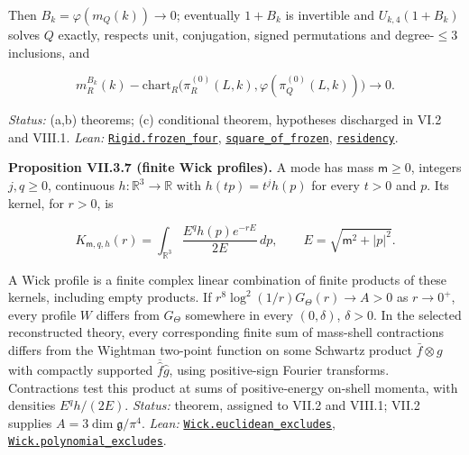 \documentclass[
  letterpaper,
  11pt]{article}
\begin{document}
Then \(B_k=\varphi(m_Q(k))\to0\); eventually \(1+B_k\) is invertible and
\(U_{k,4}(1+B_k)\) solves \(Q\) exactly, respects unit, conjugation,
signed permutations and degree-\(\le3\) inclusions, and

\[m_R^{B_k}(k)-\mathrm{chart}_R\bigl(\pi_R^{(0)}(L,k),\varphi(\pi_Q^{(0)}(L,k))\bigr)\to0.\]

\emph{Status:} (a,b) theorems; (c) conditional theorem, hypotheses
discharged in VI.2 and VIII.1. \emph{Lean:}
\href{https://github.com/yang-mills-group/OpenAI-YM-20261028/blob/3456e5e75cf8d4cd558955a5c7638fba2d68f464/YM/Pert/Rigid/Camera.lean\#L107-L113}{\texttt{Rigid.frozen\_four}},
\href{https://github.com/yang-mills-group/OpenAI-YM-20261028/blob/3456e5e75cf8d4cd558955a5c7638fba2d68f464/YM/Pert/Position/Detect.lean\#L131-L147}{\texttt{square\_of\_frozen}},
\href{https://github.com/yang-mills-group/OpenAI-YM-20261028/blob/3456e5e75cf8d4cd558955a5c7638fba2d68f464/YM/Pert/Position/Four.lean\#L32-L43}{\texttt{residency}}.

\textbf{Proposition VII.3.7 (finite Wick profiles).} A mode has mass
\(\mathsf m\ge0\), integers \(j,q\ge0\), continuous
\(h:\mathbb R^3\to\mathbb R\) with \(h(tp)=t^jh(p)\) for every \(t>0\)
and \(p\). Its kernel, for \(r>0\), is

\[K_{\mathsf m,q,h}(r)=\int_{\mathbb R^3}\frac{E^qh(p)e^{-rE}}{2E}\,dp,\qquad E=\sqrt{\mathsf m^2+|p|^2}.\]

A Wick profile is a finite complex linear combination of finite products
of these kernels, including empty products. If
\(r^8\log^2(1/r)G_\Theta(r)\to A>0\) as \(r\to0^+\), every profile \(W\)
differs from \(G_\Theta\) somewhere in every \((0,\delta)\),
\(\delta>0\). In the selected reconstructed theory, every corresponding
finite sum of mass-shell contractions differs from the Wightman
two-point function on some Schwartz product \(\bar f\otimes g\) with
compactly supported \(\overline{\widehat f}\widehat g\), using
positive-sign Fourier transforms. Contractions test this product at sums
of positive-energy on-shell momenta, with densities \(E^qh/(2E)\).
\emph{Status:} theorem, assigned to VII.2 and VIII.1; VII.2 supplies
\(A=3\dim\mathfrak g/\pi^4\). \emph{Lean:}
\href{https://github.com/yang-mills-group/OpenAI-YM-20261028/blob/3456e5e75cf8d4cd558955a5c7638fba2d68f464/YM/TraceExtension/Wick/Refute.lean\#L75-L80}{\texttt{Wick.euclidean\_excludes}},
\href{https://github.com/yang-mills-group/OpenAI-YM-20261028/blob/3456e5e75cf8d4cd558955a5c7638fba2d68f464/YM/TraceExtension/Wick/Refute.lean\#L86-L105}{\texttt{Wick.polynomial\_excludes}}.
\end{document}
